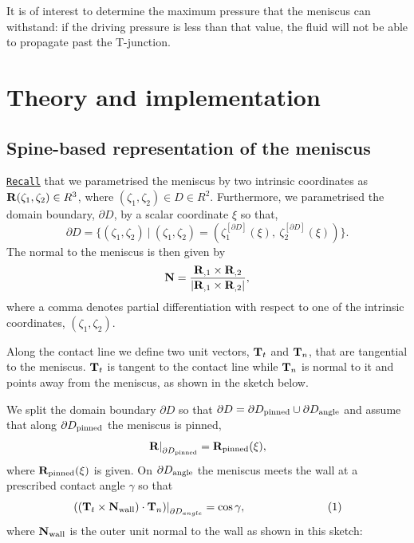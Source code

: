 It is of interest to determine the maximum pressure that the meniscus can withstand\+: if the driving pressure is less than that value, the fluid will not be able to propagate past the T-\/junction.



 

\hypertarget{index_theory}{}\section{Theory and implementation}\label{index_theory}
\hypertarget{index_spine}{}\subsection{Spine-\/based representation of the meniscus}\label{index_spine}
\href{../../young_laplace/html/index.html}{\tt Recall} that we parametrised the meniscus by two intrinsic coordinates as $ {\bf R}(\zeta_1,\zeta_2) \in {R}^3 $, where $(\zeta_1,\zeta_2) \in D \in {R}^2$. Furthermore, we parametrised the domain boundary, $\partial D$, by a scalar coordinate $\xi$ so that, \[ {\partial D} = \bigg\{ (\zeta_1,\zeta_2) \ \bigg| \ (\zeta_1,\zeta_2) = \left( \zeta_1^{[\partial D]}(\xi), \ \zeta_2^{[\partial D]}(\xi) \right) \bigg\}. \] The normal to the meniscus is then given by \[ {\bf N} = \frac{{\bf R}_{,1} \times {\bf R}_{,2} } {|{\bf R}_{,1} \times {\bf R}_{,2}|}, \] where a comma denotes partial differentiation with respect to one of the intrinsic coordinates, $ (\zeta_1, \zeta_2). $

Along the contact line we define two unit vectors, ${\bf T}_t$ and ${\bf T}_n$, that are tangential to the meniscus. ${\bf T}_t$ is tangent to the contact line while ${\bf T}_n$ is normal to it and points away from the meniscus, as shown in the sketch below.

We split the domain boundary $ \partial D $ so that $ \partial D = \partial D_{\rm pinned} \cup \partial D_{\rm angle} $ and assume that along $\partial D_{\rm pinned}$ the meniscus is pinned, \[ \left. {\bf R} \right|_{\partial D_{\rm pinned}} = {\bf R}_{\rm pinned}(\xi), \] where ${\bf R}_{\rm pinned}(\xi) $ is given. On $\partial D_{\rm angle}$ the meniscus meets the wall at a prescribed contact angle $\gamma$ so that \[ \left. \left( ({\bf T}_t \times {\bf N}_{\rm wall}) \cdot {\bf T}_n\right) \right|_{\partial D_{angle}} = \cos \gamma, \ \ \ \ \ \ \ \ \ \ \ \ \ \ \ \ \ \ \ \ \ \ (1) \] where ${\bf N}_{\rm wall}$ is the outer unit normal to the wall as shown in this sketch\+:

